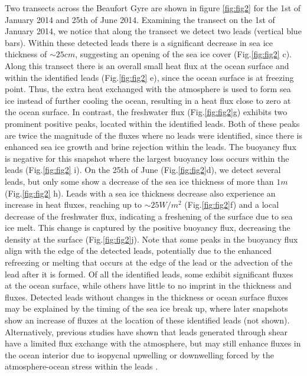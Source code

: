 \documentclass[lineno,sn-basic]{sn-jnl}%
\begin{document}
Two transects across the Beaufort Gyre are shown in figure \ref{fig:fig2} for the 1st of January 2014 and 25th of June 2014.
Examining the transect on the 1st of January 2014, we notice that along the transect we detect two leads (vertical blue bars). Within these detected leads there is a significant decrease in sea ice thickness of $\sim 25cm$, suggesting an opening of the sea ice cover (Fig.\ref{fig:fig2} c).
Along this transect there is an overall small heat flux at the ocean surface and within the identified leads (Fig.\ref{fig:fig2} e), since the ocean surface is at freezing point. Thus, the extra heat exchanged with the atmosphere is used to form sea ice instead of further cooling the ocean, resulting in a heat flux close to zero at the ocean surface.
In contrast, the freshwater flux (Fig.\ref{fig:fig2}g) exhibits two prominent positive peaks, located within the identified leads. Both of these peaks are twice the magnitude of the fluxes where no leads were identified, since there is enhanced sea ice growth and brine rejection within the leads. 
The buoyancy flux is negative for this snapshot where the largest buoyancy loss occurs within the leads (Fig.\ref{fig:fig2} i).
On the 25th of June (Fig.\ref{fig:fig2}d), we detect several leads, but only some show a decrease of the sea ice thickness of more than $1m$ (Fig.\ref{fig:fig2} h). Leads with a sea ice thickness decrease also experience an increase in heat fluxes, reaching up to $\sim 25 W/m^2$ (Fig.\ref{fig:fig2}f) and a local decrease of the freshwater flux, indicating a freshening of the surface due to sea ice melt. This change is captured by the positive buoyancy flux, decreasing the density at the surface (Fig.\ref{fig:fig2}j). Note that some peaks in the buoyancy flux align with the edge of the detected leads, potentially due to the enhanced refreezing or melting that occurs at the edge of the lead or the advection of the lead after it is formed. 
Of all the identified leads, some exhibit significant fluxes at the ocean surface, while others have little to no imprint in the thickness and fluxes. Detected leads  without changes in the thickness or ocean surface fluxes may be explained by the timing of the sea ice break up, where later snapshots show an increase of fluxes at the location of these identified leads (not shown). Alternatively, previous studies have shown that leads generated through shear have a limited flux exchange with the atmosphere, but may still enhance fluxes in the ocean interior due to isopycnal upwelling or downwelling forced by the atmosphere-ocean stress within the leads \citep{Bourgault_flux_lkf_2020}.
\end{document}
